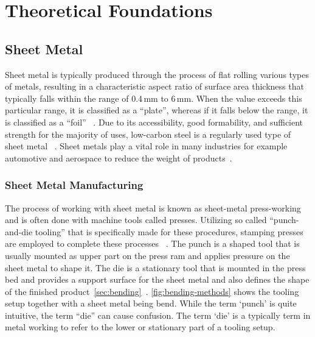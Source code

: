 \chapter{Theoretical Foundations}\label{ch:theoretical-foundations}


\section{Sheet Metal}\label{sec:sheet-metal}
Sheet metal is typically produced through the process of flat rolling various types of metals, resulting in a
characteristic aspect ratio of surface area thickness that typically falls within the range of
0.4\,mm to 6\,mm.
When the value exceeds this particular range, it is classified as a ``plate'', whereas if it falls below the range,
it is classified as a ``foil''
~\cite[p. 405]{groover2020fundamentals}.
Due to its accessibility, good formability, and sufficient strength for the majority of uses, low-carbon steel is a
regularly used type of sheet metal
~\cite[p. 405]{groover2020fundamentals}.
Sheet metals play a vital role in many industries for example automotive and aerospace to reduce the weight of
products~\cite[p. 1]{zheng_reviewformingtechniques_2018}.

\subsection{Sheet Metal Manufacturing}\label{subsec:sheet-metal-manufacturing}
The process of working with sheet metal is known as sheet-metal press-working and is often done with machine tools
called presses.
Utilizing so called ``punch-and-die tooling'' that is specifically made for these procedures, stamping presses are
employed to complete these processes
~\cite[p. 405]{groover2020fundamentals}.
The punch is a shaped tool that is usually mounted as upper part on the press ram and applies
pressure on the sheet metal to shape it.
The die is a stationary tool that is mounted in the press bed and provides a support surface for
the sheet metal and also defines the shape of the finished
product~\cref{sec:bending}~\cite[p. 412]{groover2020fundamentals}.
\cref{fig:bending-methods} shows the tooling setup together with a sheet metal being bend.
While the term `punch' is quite intuitive, the term ``die'' can cause confusion.
The term `die' is a typically term in metal working to refer to the lower or stationary part of a tooling setup.

